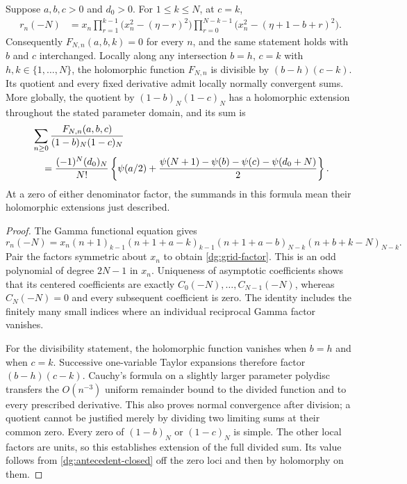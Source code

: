 \begin{proposition}
\label{dg:polynomial}
Suppose $a,b,c>0$ and $d_0>0$. For $1\leq k\leq N$, at $c=k$,
\begin{align}
 r_n(-N)&=x_n
  \prod_{r=1}^{k-1}\bigl(x_n^2-(\eta-r)^2\bigr)
  \prod_{r=0}^{N-k-1}
        \bigl(x_n^2-(\eta+1-b+r)^2\bigr).
 \label{dg:grid-factor}
\end{align}
Consequently $F_{N,n}(a,b,k)=0$ for every $n$, and the same statement
holds with $b$ and $c$ interchanged. Locally along any intersection
$b=h$, $c=k$ with $h,k\in\{1,\ldots,N\}$, the holomorphic function
$F_{N,n}$ is divisible by $(b-h)(c-k)$. Its quotient and every fixed
derivative admit locally normally convergent sums. More globally, the
quotient by $(1-b)_N(1-c)_N$ has a holomorphic extension throughout
the stated parameter domain, and its sum is
\begin{align}
 &\sum_{n\geq0}\frac{F_{N,n}(a,b,c)}{(1-b)_N(1-c)_N}\notag\\
 &\quad=\frac{(-1)^N(d_0)_N}{N!}
 \left\{\psi(a/2)+
 \frac{\psi(N+1)-\psi(b)-\psi(c)-\psi(d_0+N)}2\right\}.
 \label{dg:divided-grid}
\end{align}
At a zero of either denominator factor, the summands in this formula
mean their holomorphic extensions just described.
\end{proposition}
\begin{proof}
The Gamma functional equation gives
\[
 r_n(-N)=x_n(n+1)_{k-1}(n+1+a-k)_{k-1}
                 (n+1+a-b)_{N-k}(n+b+k-N)_{N-k}.
\]
Pair the factors symmetric about $x_n$ to obtain
\eqref{dg:grid-factor}. This is an odd polynomial of degree
$2N-1$ in $x_n$. Uniqueness of asymptotic coefficients shows that its
centered coefficients are exactly $C_0(-N),\ldots,C_{N-1}(-N)$,
whereas $C_N(-N)=0$ and every subsequent coefficient is zero.
The identity includes the finitely many small indices where an
individual reciprocal Gamma factor vanishes.

For the divisibility statement, the holomorphic function vanishes
when $b=h$ and when $c=k$. Successive one-variable Taylor expansions
therefore factor $(b-h)(c-k)$. Cauchy's formula on a slightly larger
parameter polydisc transfers the $O(n^{-3})$ uniform remainder bound
to the divided function and to every prescribed derivative. This also
proves normal convergence after division; a quotient cannot be justified
merely by dividing two limiting sums at their common zero.
Every zero of $(1-b)_N$ or $(1-c)_N$ is simple. The other local
factors are units, so this establishes extension of the full divided
sum. Its value follows from \eqref{dg:antecedent-closed} off the
zero loci and then by holomorphy on them.
\end{proof}


